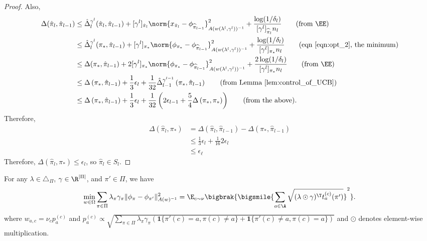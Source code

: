 \documentclass{article}
\newcommand{\pil}{\widehat{\pi}_{l}}
\newcommand{\pill}{\widehat{\pi}_{l-1}}
\newcommand{\1}{\mathbf{1}}
\begin{document}
\begin{proof}
Also, 
\begin{align*}
    \Delta(\hat{\pi}_l, \hat{\pi}_{l-1}) &\leq\hat{\Delta}_{l}^{\gamma^l}(\hat{\pi}_l, \hat{\pi}_{l-1})+[\gamma^l]_{\hat{\pi}_l}\norm{x_{\hat{\pi}_l}-\phi_{\pill}}_{A(w(\lambda^{l},\gamma^l))^{-1}}^2+\frac{\log(1/\delta_l)}{[\gamma^l]_{\pil} n_l}\tag{from $\EE$}\\
    &\leq\hat{\Delta}_{l}^{\gamma^l}(\pi_*, \hat{\pi}_{l-1})+[\gamma^l]_{\pi_*}\norm{\phi_{\pi_*}-\phi_{\pill}}_{A(w(\lambda^{l},\gamma^l))^{-1}}^2+\frac{\log(1/\delta_l)}{[\gamma^l]_{\pi_*} n_l}\tag{eqn~\eqref{eqn:opt_2}, the minimum}\\
    &\leq\Delta(\pi_*, \hat{\pi}_{l-1})+2[\gamma^l]_{\pi_*}\norm{\phi_{\pi_*}-\phi_{\pill}}_{A(w(\lambda^{l},\gamma^l))^{-1}}^2+\frac{2\log(1/\delta_l)}{[\gamma^l]_{\pi_*} n_l}\tag{from $\EE$}\\
    &\leq \Delta\left(\pi_{*}, \hat{\pi}_{l-1}\right)+\frac{1}{3}\epsilon_{l}+\frac{1}{32}\hat{\Delta}_{l-1}^{\gamma^{l-1}}\left(\pi_{*}, \hat{\pi}_{l-1}\right)\tag{from Lemma~\ref{lem:control_of_UCB}}\\
    &\leq \Delta\left(\pi_{*}, \hat{\pi}_{l-1}\right)+\frac{1}{3}\epsilon_{l}+\frac{1}{32}\left(2\epsilon_{l-1}+\frac{5}{4}\Delta\left(\pi_{*}, \pi_*\right)\right)\tag{from the above}.
\end{align*}
Therefore, 
\begin{align*}
    \Delta(\pil,\pi_*) &= \Delta(\hat{\pi}_l, \hat{\pi}_{l-1}) - \Delta\left(\pi_{*}, \hat{\pi}_{l-1}\right) \\
    &\leq \frac{1}{3}\epsilon_{l} + \frac{1}{16} 2\epsilon_{l}\\
    &\leq \epsilon_{\ell}
\end{align*}
Therefore, $\Delta(\pil,\pi_*)\leq\epsilon_l$, so $\pil\in S_l$.

\end{proof}

\begin{lemma}\label{lem:est_design_2}
For any $\lambda\in\triangle_\Pi$, $\gamma\in\R^{|\Pi|}$, and $\pi'\in\Pi$, we have 
\[\min_{w\in\Omega}\sum_{\pi\in \Pi} \lambda_{\pi}\gamma_\pi\|\phi_{\pi}-\phi_{\pi'}\|_{A(w)^{-1}}^2=\E_{c\sim\nu}\bigbrak{\bigsmile{\sum_{a\in\A}\sqrt{(\lambda\odot \gamma)^\T t_a^{(c)}(\pi')}}^2}.\]
where $w_{a,c}=\nu_c p_a^{(c)}$ and $p_a^{(c)}\propto \sqrt{ \sum_{\pi \in \Pi} \lambda_\pi \gamma_\pi(\1\{ \pi'(c) = a, \pi(c) \neq a \} + \1\{ \pi'(c) \neq a, \pi(c) = a \}) }$ and $\odot$ denotes element-wise multiplication. 
\end{lemma}
\end{document}
